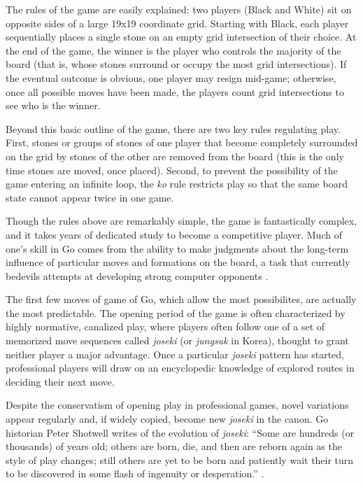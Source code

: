 \documentclass[reqno,12pt]{amsart}
\begin{document}
The rules of the game are easily explained: two players (Black and White) sit on opposite sides of a large 19x19 coordinate grid. Starting with Black, each player sequentially places a single stone on an empty grid intersection of their choice. At the end of the game, the winner is the player who controls the majority of the board (that is, whose stones surround or occupy the most grid intersections). If the eventual outcome is obvious, one player may resign mid-game; otherwise, once all possible moves have been made, the players count grid intersections to see who is the winner.

Beyond this basic outline of the game, there are two key rules regulating play. First, stones or groups of stones of one player that become completely surrounded on the grid by stones of the other are removed from the board (this is the only time stones are moved, once placed). Second, to prevent the possibility of the game entering an infinite loop, the \textit{ko} rule restricts play so that the same board state cannot appear twice in one game.

Though the rules above are remarkably simple, the game is fantastically complex, and it takes years of dedicated study to become a competitive player. Much of one's skill in Go comes from the ability to make judgments about the long-term influence of particular moves and formations on the board, a task that currently bedevils attempts at developing strong computer opponents \citep{rimmel2010current}.

The first few moves of game of Go, which allow the most possibilites, are actually the most predictable. The opening period of the game is often characterized by highly normative, canalized play, where players often follow one of a set of memorized move sequences called \textit{joseki} (or \textit{jungsuk} in Korea), thought to grant neither player a major advantage. Once a particular \textit{joseki} pattern has started, professional players will draw on an encyclopedic knowledge of explored routes in deciding their next move.

Despite the conservatism of opening play in professional games, novel variations appear regularly and, if widely copied, become new \textit{joseki} in the canon. Go historian Peter Shotwell writes of the evolution of \textit{joseki}: ``Some are hundreds (or thousands) of years old; others are born, die, and then are reborn again as the style of play changes; still others are yet to be born and patiently wait their turn to be discovered in some flash of ingenuity or desperation.'' \citep{shotwell2011go}.
\end{document}
